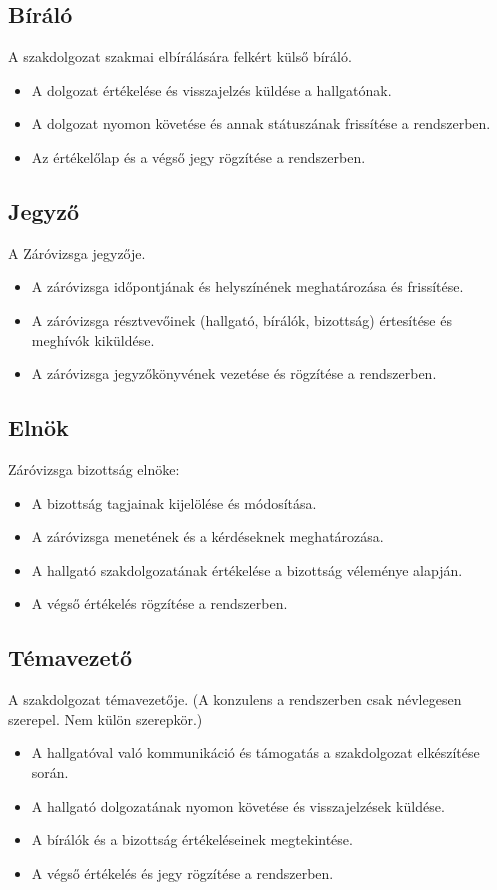\documentclass[a4paper,12pt]{article}
\begin{document}
\subsection{Bíráló}

A szakdolgozat szakmai elbírálására felkért külső bíráló.
\begin{itemize}
	\item A dolgozat értékelése és visszajelzés küldése a hallgatónak.
	\item A dolgozat nyomon követése és annak státuszának frissítése a rendszerben.
	\item Az értékelőlap és a végső jegy rögzítése a rendszerben.
\end{itemize}

\subsection{Jegyző}

A Záróvizsga jegyzője.
\begin{itemize}
	\item A záróvizsga időpontjának és helyszínének meghatározása és frissítése.
	\item A záróvizsga résztvevőinek (hallgató, bírálók, bizottság) értesítése és meghívók kiküldése.
	\item A záróvizsga jegyzőkönyvének vezetése és rögzítése a rendszerben.
\end{itemize}

\subsection{Elnök}

Záróvizsga bizottság elnöke:
\begin{itemize}
	\item A bizottság tagjainak kijelölése és módosítása.
	\item A záróvizsga menetének és a kérdéseknek meghatározása.
	\item A hallgató szakdolgozatának értékelése a bizottság véleménye alapján.
	\item A végső értékelés rögzítése a rendszerben.
\end{itemize}

\subsection{Témavezető}

A szakdolgozat témavezetője. (A konzulens a rendszerben csak névlegesen szerepel. Nem külön szerepkör.)
\begin{itemize}
	\item A hallgatóval való kommunikáció és támogatás a szakdolgozat elkészítése során.
	\item A hallgató dolgozatának nyomon követése és visszajelzések küldése.
	\item A bírálók és a bizottság értékeléseinek megtekintése.
	\item A végső értékelés és jegy rögzítése a rendszerben.
\end{itemize}
\end{document}
